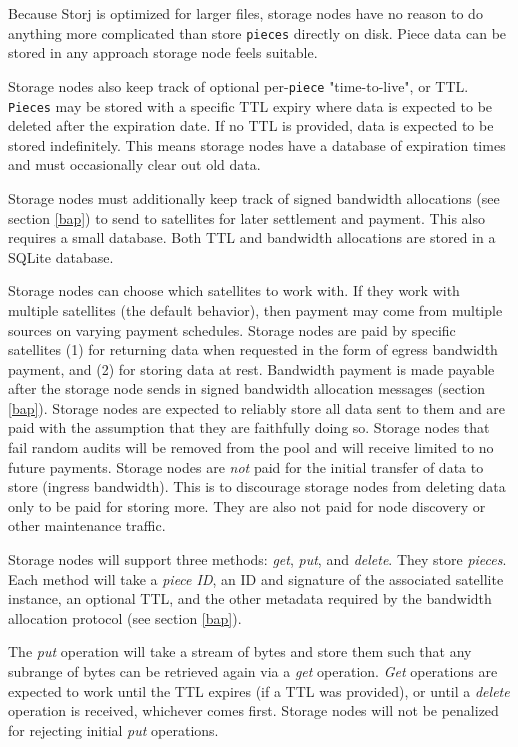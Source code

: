\documentclass[11pt,fleqn,openany]{book}
\newcommand{\x}[1]{{\tt #1}} \newcommand{\code}[1]{{\em #1}}
\begin{document}
Because Storj is optimized for larger files, storage nodes have no reason to do
anything more complicated than store \x{pieces} directly on disk. Piece data
can be stored in any approach storage node feels suitable.

Storage nodes also keep track of optional per-\x{piece} "time-to-live", or TTL.
\x{Pieces} may be stored with a specific TTL expiry where data is expected to
be deleted after the expiration date. If no TTL is provided, data is expected
to be stored indefinitely. This means storage nodes have a database of
expiration
times and must occasionally clear out old data.

Storage nodes must additionally keep track of signed bandwidth allocations
(see section \ref{bap}) to send to
satellites for later settlement and payment. This also requires a small
database. Both TTL and bandwidth allocations are stored in a SQLite
\cite{sqlite} database.

Storage nodes can choose which satellites to work with. If they work
with multiple satellites (the default behavior), then payment may come from
multiple sources on varying payment schedules.
Storage nodes are paid by specific satellites (1) for returning data when
requested in
the form of egress bandwidth payment, and (2) for storing data at rest.
Bandwidth payment is made payable after
the storage node sends in signed bandwidth allocation messages
(section \ref{bap}).
Storage nodes are expected to reliably store all data sent to them and are
paid
with the assumption that they are faithfully doing so.
Storage nodes that fail random audits will be removed from the pool and will
receive
limited to no future payments.
Storage nodes are {\em not} paid for the initial transfer of data to store
(ingress
bandwidth). This is to discourage storage nodes from deleting data only to be
paid for
storing more. They are also not paid for node discovery or other
maintenance traffic.

Storage nodes will support three methods: \code{get}, \code{put}, and
\code{delete}. They store {\em pieces}.
Each method will take a {\em piece ID}, an ID and signature of the associated
satellite instance, an optional TTL, and the other metadata required by the
bandwidth allocation protocol (see section \ref{bap}).

The \code{put} operation will take a stream of bytes and store them such
that any subrange of bytes can be retrieved again via a \code{get} operation.
\code{Get} operations are expected to work until the TTL expires (if a TTL was
provided), or until a \code{delete} operation is received, whichever comes
first.
Storage
nodes will not be penalized for rejecting initial \code{put} operations.
\end{document}
